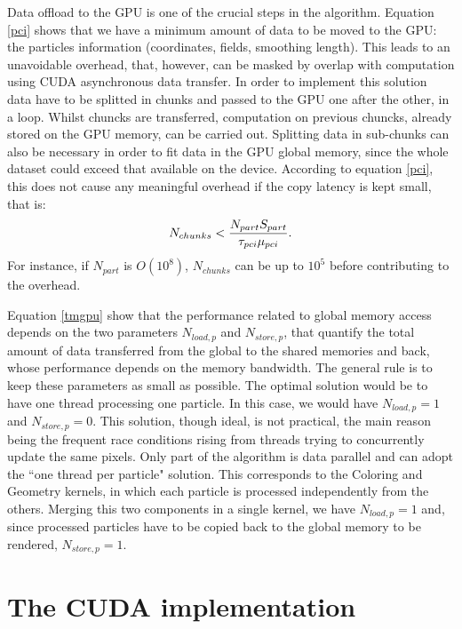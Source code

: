\documentclass[11pt]{article}
\begin{document}
Data offload to the GPU is one of the crucial steps in the algorithm. 
Equation \eqref{pci} shows that we have a minimum amount of data 
to be moved to the GPU: the particles information (coordinates, fields, smoothing length). This leads to an 
unavoidable overhead, that, however, can be masked by overlap with computation using
CUDA asynchronous data transfer. In order to implement this solution data have to be
splitted in chunks and passed to the GPU one after the other, in a loop. Whilst chuncks 
are transferred, computation on previous chuncks, already stored on the GPU
memory, can be carried out. Splitting data in sub-chunks can also be necessary
in order to fit data in the GPU global memory, since the whole dataset could exceed
that available on the device. According to equation \eqref{pci}, this does not 
cause any meaningful overhead if the copy latency is kept small, that is:
\begin{equation}
N_{chunks} < {N_{part} S_{part}\over \tau_{pci}\mu_{pci}}.
\end{equation}
For instance, if $N_{part}$ is $O(10^8)$, $N_{chunks}$ can be up to $10^5$ before
contributing to the overhead.

Equation \eqref{tmgpu} show that the performance related to global memory access
depends on the two parameters $N_{load,p}$ and $N_{store,p}$, that quantify the 
total amount of data transferred from the global to the shared memories and back,
whose performance depends on the memory bandwidth.
The general rule is to keep these parameters
as small as possible. 
The optimal solution would be to have one thread 
processing one particle. In this case, we would have $N_{load,p} = 1$ and $N_{store,p} = 0$.
This solution, though ideal, is not practical, the main reason being the frequent race conditions 
rising from threads trying to concurrently update the same pixels.
Only part of the algorithm is data parallel and can adopt the ``one thread per particle" solution.
This corresponds to the Coloring and Geometry kernels, in which each particle 
is processed independently from the others. Merging this two components in a single
kernel, we have $N_{load,p} = 1$ and, since processed particles
have to be copied back to the global memory to be rendered, $N_{store,p} = 1$. 

\section{The CUDA implementation}
\end{document}
